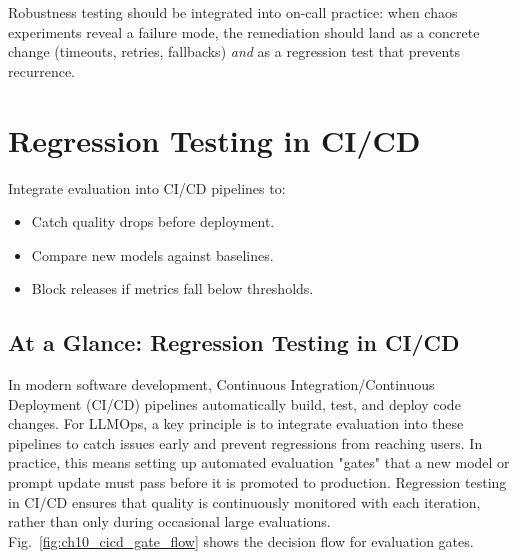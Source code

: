 Robustness testing should be integrated into on-call practice: when chaos experiments reveal a failure mode, the remediation should land as a concrete change (timeouts, retries, fallbacks) \emph{and} as a regression test that prevents recurrence.

\section{Regression Testing in CI/CD}
\label{sec:ch10-regression-testing-in-ci-cd}
Integrate evaluation into CI/CD pipelines to:
\begin{itemize}
    \item Catch quality drops before deployment.
    \item Compare new models against baselines.
    \item Block releases if metrics fall below thresholds.
\end{itemize}

\subsection*{At a Glance: Regression Testing in CI/CD}
In modern software development, Continuous Integration/Continuous Deployment (CI/CD) pipelines automatically build, test, and deploy code changes. For LLMOps, a key principle is to integrate evaluation into these pipelines to catch issues early and prevent regressions from reaching users. In practice, this means setting up automated evaluation "gates" that a new model or prompt update must pass before it is promoted to production. Regression testing in CI/CD ensures that quality is continuously monitored with each iteration, rather than only during occasional large evaluations.
Fig.~\ref{fig:ch10_cicd_gate_flow} shows the decision flow for evaluation gates.

